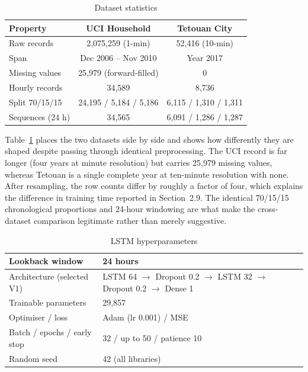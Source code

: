 \documentclass[11pt,a4paper]{article}
\begin{document}
\begin{table}[htbp]
\centering
\caption{Dataset statistics}
\label{tab:datasets}
\small
\renewcommand{\arraystretch}{1.3}
\begin{tabular}{|l|c|c|}
\hline
\textbf{Property} & \textbf{UCI Household} & \textbf{Tetouan City}\\ \hline
Raw records & 2{,}075{,}259 (1-min) & 52{,}416 (10-min)\\ \hline
Span & Dec 2006 -- Nov 2010 & Year 2017\\ \hline
Missing values & 25{,}979 (forward-filled) & 0\\ \hline
Hourly records & 34{,}589 & 8{,}736\\ \hline
Split 70/15/15 & 24{,}195 / 5{,}184 / 5{,}186 & 6{,}115 / 1{,}310 / 1{,}311\\ \hline
Sequences (24 h) & 34{,}565 & 6{,}091 / 1{,}286 / 1{,}287\\ \hline
\end{tabular}
\end{table}

Table~\ref{tab:datasets} places the two datasets side by side and shows how differently they are shaped despite passing through identical preprocessing. The UCI record is far longer (four years at minute resolution) but carries 25{,}979 missing values, whereas Tetouan is a single complete year at ten-minute resolution with none. After resampling, the row counts differ by roughly a factor of four, which explains the difference in training time reported in Section~2.9. The identical 70/15/15 chronological proportions and 24-hour windowing are what make the cross-dataset comparison legitimate rather than merely suggestive.

\begin{table}[htbp]
\centering
\caption{LSTM hyperparameters}
\label{tab:hyper}
\small
\renewcommand{\arraystretch}{1.3}
\begin{tabular}{|l|p{9.2cm}|}
\hline
Lookback window & 24 hours\\ \hline
Architecture (selected V1) & LSTM 64 $\to$ Dropout 0.2 $\to$ LSTM 32 $\to$ Dropout 0.2 $\to$ Dense 1\\ \hline
Trainable parameters & 29{,}857\\ \hline
Optimiser / loss & Adam (lr 0.001) / MSE\\ \hline
Batch / epochs / early stop & 32 / up to 50 / patience 10\\ \hline
Random seed & 42 (all libraries)\\ \hline
\end{tabular}
\end{table}
\end{document}
